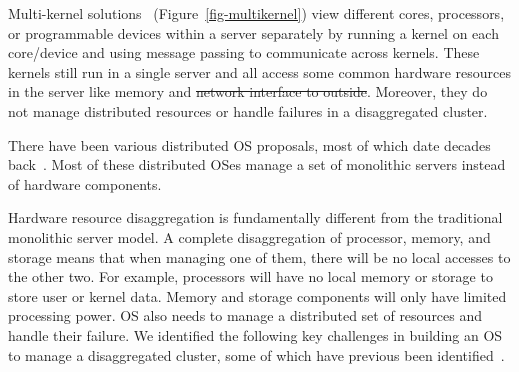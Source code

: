\documentclass[10pt,times,twocolumn]{z2-article}
\providecommand{\DIFaddtex}[1]{{\protect\color{blue}\uwave{#1}}} %
\providecommand{\DIFdeltex}[1]{{\protect\color{red}\sout{#1}}}                      %
\providecommand{\DIFaddbegin}{} %
\providecommand{\DIFaddend}{} %
\providecommand{\DIFdelbegin}{} %
\providecommand{\DIFdelend}{} %
\providecommand{\DIFadd}[1]{\texorpdfstring{\DIFaddtex{#1}}{#1}} %
\providecommand{\DIFdel}[1]{\texorpdfstring{\DIFdeltex{#1}}{}} %
\newcommand{\DIFscaledelfig}{0.5}
\newlength{\DIFdelgraphicswidth} %
\newlength{\DIFdelgraphicsheight} %
\newcommand{\DIFaddincludegraphics}[2][]{{\color{blue}\fbox{\DIFOincludegraphics[#1]{#2}}}} %
\newcommand{\DIFdelincludegraphics}[2][]{%
\sbox{\DIFdelgraphicsbox}{\DIFOincludegraphics[#1]{#2}}%
\settoboxwidth{\DIFdelgraphicswidth}{\DIFdelgraphicsbox} %
\settoboxtotalheight{\DIFdelgraphicsheight}{\DIFdelgraphicsbox} %
\scalebox{\DIFscaledelfig}{%
\parbox[b]{\DIFdelgraphicswidth}{\usebox{\DIFdelgraphicsbox}\\[-\baselineskip] \rule{\DIFdelgraphicswidth}{0em}}\llap{\resizebox{\DIFdelgraphicswidth}{\DIFdelgraphicsheight}{%
\setlength{\unitlength}{\DIFdelgraphicswidth}%
\begin{picture}(1,1)%
\thicklines\linethickness{2pt} %
{\color[rgb]{1,0,0}\put(0,0){\framebox(1,1){}}}%
{\color[rgb]{1,0,0}\put(0,0){\line( 1,1){1}}}%
{\color[rgb]{1,0,0}\put(0,1){\line(1,-1){1}}}%
\end{picture}%
}\hspace*{3pt}}} %
} %
\DeclareRobustCommand{\DIFaddbegin}{\DIFOaddbegin \let\includegraphics\DIFaddincludegraphics} %
\DeclareRobustCommand{\DIFaddend}{\DIFOaddend \let\includegraphics\DIFOincludegraphics} %
\DeclareRobustCommand{\DIFdelbegin}{\DIFOdelbegin \let\includegraphics\DIFdelincludegraphics} %
\DeclareRobustCommand{\DIFdelend}{\DIFOaddend \let\includegraphics\DIFOincludegraphics} %
\begin{document}
{Multi-kernel solutions~\cite{Baumann-SOSP09,Barrelfish-DC,Helios-SOSP,fos-SOCC,Hive-SOSP} (Figure~\ref{fig-multikernel}) 
view different cores, processors, or programmable devices within a server separately 
by running a kernel on each core/device and using message passing to communicate across kernels.
These kernels still run in a single server and all access some common hardware resources in the server like memory and \DIFdelbegin \DIFdel{network interface to outside}\DIFdelend \DIFaddbegin \DIFadd{the network interface}\DIFaddend .
Moreover, they do not manage distributed resources or handle failures in a disaggregated cluster. 

There have been various distributed OS proposals,
most of which date decades back~\cite{Amoeba-Experience,Sprite,MOSIX}. %
Most of these distributed OSes manage a set of monolithic servers
instead of hardware components.

Hardware resource disaggregation is fundamentally different from the traditional monolithic server model.
A complete disaggregation of processor, memory, and storage 
means that when managing one of them, there will be no local accesses to the other two.
For example, processors will have no local memory or storage to store user or kernel data.
Memory and storage components will only have limited processing power. %
OS also needs to manage a distributed set of resources and handle their failure.
We identified the following key challenges in building an OS to manage a disaggregated cluster,
some of which have previous been identified~\cite{HP-MemoryOS}.

}
\end{document}
